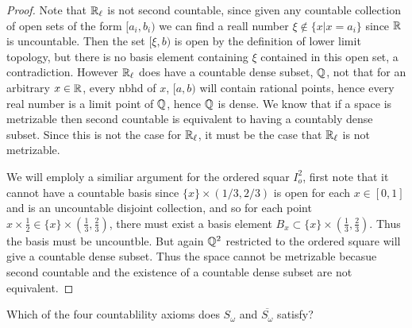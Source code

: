     \begin{proof}
        Note that $\mathbb{R}_{\ell}$ is not second countable, since given any countable collection of open sets of the form $[a_i, b_i)$ we can find a reall number $\xi \notin \{x | x = a_i \}$ since $\mathbb{R}$ is uncountable. Then the set $[\xi, b)$ is open by the definition of lower limit topology, but there is no basis element containing 
        $\xi$ contained in this open set, a contradiction. However $\mathbb{R}_{\ell}$ does have a countable dense subset, $\mathbb{Q}$, not that for an arbitrary $x \in \mathbb{R}$, every nbhd of $x$, $[a, b)$ will contain rational points, hence every real number is a limit point of $\mathbb{Q}$, hence $\mathbb{Q}$ is dense. 
        We know that if a space is metrizable then second countable is equivalent to having a countably dense subset. Since this is not the case for $\mathbb{R}_{\ell}$, it must be the case that $\mathbb{R}_{\ell}$ is not metrizable. 

        We will emploly a similiar argument for the ordered squar $I^2_o$, first note that it cannot have a countable basis since $\{x\} \times (1/3, 2/3)$ is open for each $x \in [0,1]$ and is an uncountable disjoint collection, 
        and so for each point $x \times \frac{1}{2} \in \{x\} \times (\frac{1}{3}, \frac{2}{3})$, there must exist a basis element $B_x \subset \{x\} \times (\frac{1}{3}, \frac{2}{3})$. Thus the basis must be uncountble. 
        But again $\mathbb{Q}^2$ restricted to the ordered square will give a countable dense subset. Thus the space cannot be metrizable becasue second countable and the existence of a countable dense subset are not equivalent. 

    \end{proof}

    \question 
    Which of the four countablility axioms does $S_\omega$ and $\overline{S_\omega}$ satisfy? 

